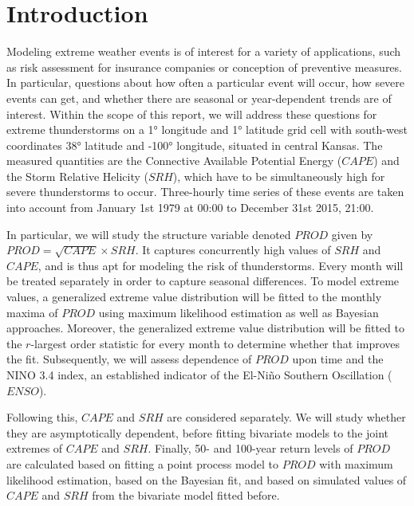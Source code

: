 \documentclass[10pt,conference,compsocconf]{IEEEtran}
\begin{document}
\section*{Introduction} 
Modeling extreme weather events is of interest for a variety of applications, such as risk assessment for insurance companies or conception of preventive measures. In particular, questions about how often a particular event will occur, how severe events can get, and whether there are seasonal or year-dependent trends are of interest. Within the scope of this report, we will address these questions for extreme thunderstorms on a 1° longitude and 1° latitude grid cell with south-west coordinates 38° latitude and -100° longitude, situated in central Kansas. The measured quantities are the Connective Available Potential Energy ($CAPE$) and the Storm Relative Helicity ($SRH$), which have to be simultaneously high for severe thunderstorms to occur. Three-hourly time series of these events are taken into account from January 1st 1979 at 00:00 to December 31st 2015, 21:00. 
\par
In particular, we will study the structure variable denoted $PROD$ given by $PROD = \sqrt{CAPE} \times SRH$. It captures concurrently high values of $SRH$ and $CAPE$, and is thus apt for modeling the risk of thunderstorms. Every month will be treated separately in order to capture seasonal differences. To model extreme values, a generalized extreme value distribution will be fitted to the monthly maxima of $PROD$ using maximum likelihood estimation as well as Bayesian approaches. Moreover, the generalized extreme value distribution will be fitted to the $r$-largest order statistic for every month to determine whether that improves the fit. Subsequently, we will assess dependence of $PROD$ upon time and the NINO 3.4 index, an established indicator of the El-Niño Southern Oscillation ($ENSO$). 
\par
Following this, $CAPE$ and $SRH$ are considered separately. We will study whether they are asymptotically dependent, before fitting bivariate models to the joint extremes of $CAPE$ and $SRH$. 
Finally, 50- and 100-year return levels of $PROD$ are calculated based on fitting a point process model to $PROD$ with maximum likelihood estimation, based on the Bayesian fit, and based on simulated values of $CAPE$ and $SRH$ from the bivariate model fitted before. 
\end{document}
